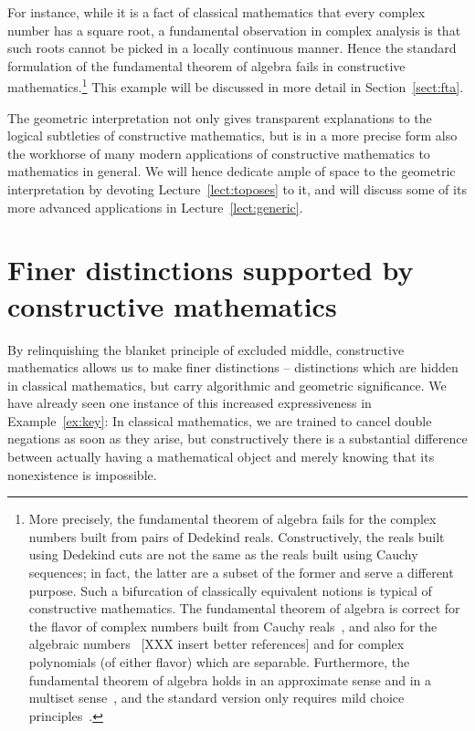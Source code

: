 \documentclass[10pt,reqno,a4paper,openany]{amsbook}
\theoremstyle{definition}
\theoremstyle{plain}
\theoremstyle{remark}
\newcommand{\?}{\,{:}\,}
\renewcommand{\_}{\mathpunct{.}\,}
\begin{document}
For instance, while it is a fact of classical mathematics that every complex
number has a square root, a fundamental observation in complex analysis is that
such roots cannot be picked in a locally continuous manner. Hence the standard
formulation of the fundamental theorem of algebra fails in constructive
mathematics.\footnote{More precisely, the fundamental theorem of algebra fails
for the complex numbers built from pairs of Dedekind reals. Constructively, the
reals built using Dedekind cuts are not the same as the reals built using
Cauchy sequences; in fact, the latter are a subset of the former and serve a
different purpose. Such a bifurcation of classically equivalent notions is
typical of constructive mathematics. The fundamental theorem of algebra is
correct for the flavor of complex numbers built from Cauchy
reals~\cite{ruitenburg:roots}, and also for the algebraic
numbers~\cite[Section~VII.4]{mines-richman-ruitenburg:constructive-algebra}
[XXX insert better references] and for complex polynomials (of either flavor)
which are separable. Furthermore, the fundamental theorem of algebra holds in
an approximate sense and in a multiset sense~\cite{richman:fta}, and the
standard version only requires mild choice
principles~\cite{bridges-richman-schuster:wcc}.} This example will be discussed
in more detail in Section~\ref{sect:fta}.

The geometric interpretation not only gives transparent explanations to the
logical subtleties of constructive mathematics, but is in a more precise form
also the workhorse of many modern applications of constructive mathematics to
mathematics in general. We will hence dedicate ample of space to the geometric
interpretation by devoting Lecture~\ref{lect:toposes} to it, and will discuss
some of its more advanced applications in Lecture~\ref{lect:generic}.


\section{Finer distinctions supported by constructive mathematics}

By relinquishing the blanket principle of excluded middle, constructive
mathematics allows us to make finer distinctions -- distinctions which are
hidden in classical mathematics, but carry algorithmic and geometric
significance. We have already seen one instance of this increased
expressiveness in Example~\ref{ex:key}: In classical mathematics, we are
trained to cancel double negations as soon as they arise, but constructively
there is a substantial difference between actually having a mathematical object
and merely knowing that its nonexistence is impossible.
\end{document}
